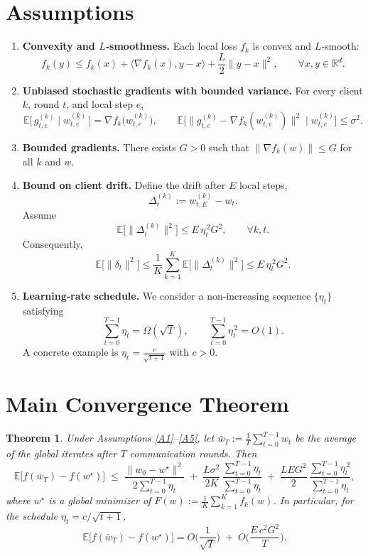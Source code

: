 \documentclass[11pt]{article}
\newtheorem{theorem}{Theorem}
\newcommand{\E}{\mathbb{E}}
\newcommand{\R}{\mathbb{R}}
\begin{document}
\section*{Assumptions}
\begin{enumerate}[label={\bf A\arabic*}:, leftmargin=*]
\item \label{A1}
\textbf{Convexity and $L$‑smoothness.}  
Each local loss $f_k$ is convex and $L$‑smooth:
\[
f_k(y)\le f_k(x)+\langle\nabla f_k(x),y-x\rangle+\frac{L}{2}\|y-x\|^2,\qquad\forall x,y\in\R^d .
\]

\item \label{A2}
\textbf{Unbiased stochastic gradients with bounded variance.}  
For every client $k$, round $t$, and local step $e$,
\[
\E\big[\,g_{t,e}^{(k)}\mid w_{t,e}^{(k)}\,\big]=\nabla f_k\big(w_{t,e}^{(k)}\big),\qquad
\E\big[\|g_{t,e}^{(k)}-\nabla f_k(w_{t,e}^{(k)})\|^2\mid w_{t,e}^{(k)}\big]\le\sigma^2 .
\]

\item \label{A3}
\textbf{Bounded gradients.}  
There exists $G>0$ such that $\|\nabla f_k(w)\|\le G$ for all $k$ and $w$.

\item \label{A4}
\textbf{Bound on client drift.}  
Define the drift after $E$ local steps,
\[
\Delta_{t}^{(k)}:=w_{t,E}^{(k)}-w_t .
\]
Assume
\[
\E\big[\|\Delta_{t}^{(k)}\|^2\big]\le E\,\eta_t^{\,2} G^{2},\qquad\forall k,t .
\]
Consequently,
\[
\E\big[\|\delta_t\|^2\big]\le \frac{1}{K}\sum_{k=1}^{K}\E\big[\|\Delta_{t}^{(k)}\|^2\big]
\le E\,\eta_t^{\,2} G^{2}.
\]

\item \label{A5}
\textbf{Learning‑rate schedule.}  
We consider a non‑increasing sequence $\{\eta_t\}$ satisfying
\[
\sum_{t=0}^{T-1}\eta_t = \Omega(\sqrt{T}),\qquad
\sum_{t=0}^{T-1}\eta_t^{\,2}=O(1).
\]
A concrete example is $\eta_t=\frac{c}{\sqrt{t+1}}$ with $c>0$.
\end{enumerate}

\section*{Main Convergence Theorem}
\begin{theorem}
\label{thm:main}
Under Assumptions \ref{A1}–\ref{A5}, let $\bar w_T:=\frac{1}{T}\sum_{t=0}^{T-1} w_t$ be the average of the global iterates after $T$ communication rounds. Then
\[
\E\!\big[f(\bar w_T)-f(w^\star)\big]
\;\le\;
\frac{\|w_0-w^\star\|^2}{2\sum_{t=0}^{T-1}\eta_t}
\;+\;
\frac{L\sigma^2}{2K}\,\frac{\sum_{t=0}^{T-1}\eta_t}{\sum_{t=0}^{T-1}\eta_t}
\;+\;
\frac{L E G^{2}}{2}\,\frac{\sum_{t=0}^{T-1}\eta_t^{\,2}}{\sum_{t=0}^{T-1}\eta_t},
\]
where $w^\star$ is a global minimizer of $F(w):=\frac1K\sum_{k=1}^{K}f_k(w)$.  
In particular, for the schedule $\eta_t=c/\sqrt{t+1}$,
\[
\E\!\big[f(\bar w_T)-f(w^\star)\big]=O\!\Big(\frac{1}{\sqrt{T}}\Big)
\;+\;O\!\Big(\frac{E\,c^{2}G^{2}}{T}\Big).
\]
\end{theorem}
\end{document}
